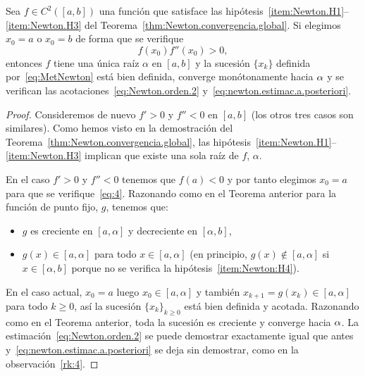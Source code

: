 \begin{corollary}
  Sea $f \in C^2([a,b])$ una función que satisface las
  hipótesis~\ref{item:Newton.H1}--\ref{item:Newton.H3} del
  Teorema~\ref{thm:Newton.convergencia.global}. Si elegimos $x_0=a$
  o $x_0=b$ de forma que se verifique
  \begin{equation}
    \label{eq:4}
    f(x_0) f''(x_0) > 0,
  \end{equation}
  entonces $f$ tiene una única raíz $\alpha$ en $[a,b]$ y la
  sucesión $\{x_k\}$ definida por~\eqref{eq:MetNewton} está bien
  definida, converge monótonamente hacia $\alpha$ y se verifican las
  acotaciones~\eqref{eq:Newton.orden.2}
  y~\eqref{eq:newton.estimac.a.posteriori}.
  \label{cor:regla.fourier}    
  \end{corollary}
  \begin{proof}
    Consideremos de nuevo $f'>0$ y $f''<0$ en $[a,b]$ (los otros tres
    casos son similares).  Como hemos visto en la demostración del
    Teorema~\ref{thm:Newton.convergencia.global}, las
    hipótesis~\ref{item:Newton.H1}--\ref{item:Newton.H3} implican que
    existe una sola raíz de $f$, $\alpha$.

    En el caso $f'>0$ y $f''<0$ tenemos que $f(a)<0$ y por tanto
    elegimos $x_0=a$ para que se verifique~\eqref{eq:4}.  Razonando
    como en el Teorema anterior para la función de punto fijo, $g$,
    tenemos que:
    \begin{itemize}
    \item $g$ es creciente en $[a,\alpha]$ y decreciente en
      $[\alpha,b]$,
    \item $g(x)\in [a,\alpha]$ para todo $x\in [a,\alpha]$ (en
      principio, $g(x)\not\in [a,\alpha]$ si $x\in[\alpha,b]$ porque
      no se verifica la hipótesis~\ref{item:Newton:H4}).
    \end{itemize}
    En el caso actual, $x_0=a$ luego $x_0\in [a,\alpha]$ y
    también $x_{k+1}=g(x_k)\in [a,\alpha]$ para todo $k\ge 0$, así
    la sucesión $\{x_k\}_{k\ge 0}$ está bien definida y
    acotada. Razonando como en el Teorema anterior, toda la sucesión es
    creciente y converge hacia $\alpha$. La
    estimación~\eqref{eq:Newton.orden.2} se puede demostrar
    exactamente igual que antes
    y~\eqref{eq:newton.estimac.a.posteriori} se deja sin demostrar,
    como en la observación~\ref{rk:4}.
  \end{proof}
  
